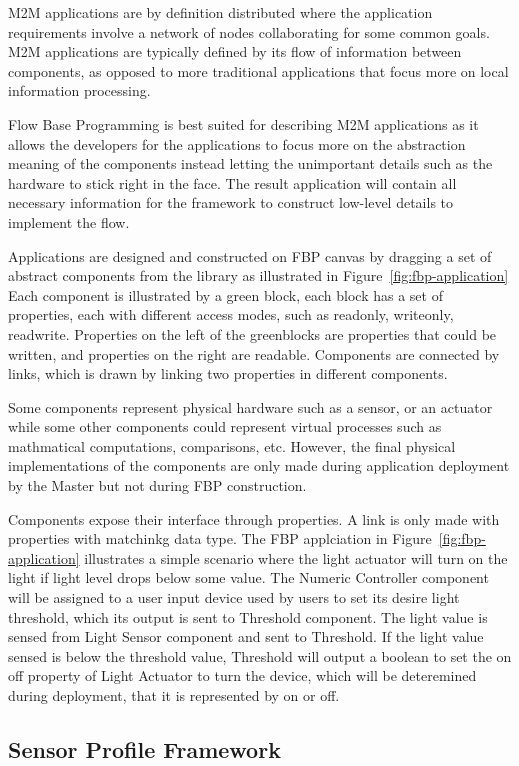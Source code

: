 M2M applications are by definition distributed where the application
requirements involve a network of nodes collaborating for some common 
goals. M2M applications are typically defined by its flow of information
between components, as opposed to more traditional applications that focus more
on local information processing.

Flow Base Programming is best suited for describing M2M applications as it
allows the developers for the applications to focus more on the
abstraction meaning of the components instead letting the unimportant details
such as the hardware to stick right in the face. The result application will
contain all necessary information for the framework to construct low-level
details to implement the flow.

Applications are designed and constructed on FBP canvas by dragging a set of
abstract components from the library as illustrated in Figure~\ref{fig:fbp-application} 
Each component is
illustrated by a green block, each block has a set of properties, each with
different access modes, such as readonly, writeonly, readwrite. Properties on
the left of the greenblocks are properties that could be written, and
properties on the right are readable. Components are connected by links, which
is drawn by linking two properties in different components.

Some components represent physical hardware such as a sensor, or an actuator
while some other components could represent virtual processes such as
mathmatical computations, comparisons, etc. However, the final physical implementations
of the components are only made during application deployment by the Master but
not during FBP construction.

Components expose their interface through properties. A link is only made with
properties with matchinkg data type. The FBP applciation in
Figure~\ref{fig:fbp-application} illustrates a simple scenario where the light actuator
will turn on the light if light level drops below some value. The Numeric
Controller component will be assigned to a user input device used by users to
set its desire light threshold, which its output is sent to Threshold
component. The light value is sensed from Light Sensor component and sent to
Threshold. If the light value sensed is below the threshold value, Threshold
will output a boolean to set the on off property of Light Actuator to turn the
device, which will be deteremined during deployment, that it is represented by
on or off.

\subsection{Sensor Profile Framework}

